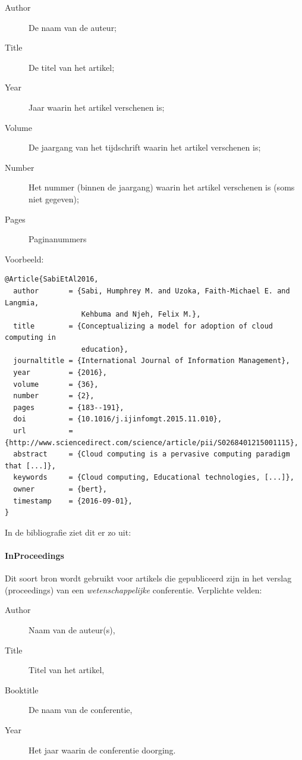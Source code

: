 \begin{description}
\item[Author] De naam van de auteur;
\item[Title] De titel van het artikel;
\item[Year] Jaar waarin het artikel verschenen is;
\item[Volume] De jaargang van het tijdschrift waarin het artikel verschenen is;
\item[Number] Het nummer (binnen de jaargang) waarin het artikel verschenen is (soms niet gegeven);
\item[Pages] Paginanummers
\end{description}

Voorbeeld:
\begin{verbatim}
@Article{SabiEtAl2016,
  author       = {Sabi, Humphrey M. and Uzoka, Faith-Michael E. and Langmia,
                  Kehbuma and Njeh, Felix M.},
  title        = {Conceptualizing a model for adoption of cloud computing in
                  education},
  journaltitle = {International Journal of Information Management},
  year         = {2016},
  volume       = {36},
  number       = {2},
  pages        = {183--191},
  doi          = {10.1016/j.ijinfomgt.2015.11.010},
  url          = {http://www.sciencedirect.com/science/article/pii/S0268401215001115},
  abstract     = {Cloud computing is a pervasive computing paradigm that [...]},
  keywords     = {Cloud computing, Educational technologies, [...]},
  owner        = {bert},
  timestamp    = {2016-09-01},
}
\end{verbatim}

In de bibliografie ziet dit er zo uit: 

\paragraph{InProceedings}

Dit soort bron wordt gebruikt voor artikels die gepubliceerd zijn in het verslag (proceedings) van een \emph{wetenschappelijke} conferentie. Verplichte velden:

\begin{description}
  \item[Author] Naam van de auteur(s),
  \item[Title] Titel van het artikel,
  \item[Booktitle] De naam van de conferentie,
  \item[Year] Het jaar waarin de conferentie doorging.
\end{description}

